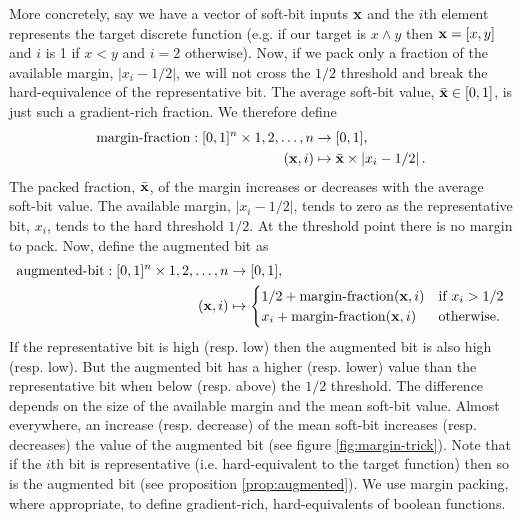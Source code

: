 \documentclass{article} %
\begin{document}
More concretely, say we have a vector of soft-bit inputs ${\bf x}$ and the $i$th element represents the target discrete function (e.g. if our target is $x \wedge y$ then ${\bf x}=[x,y]$ and $i$ is 1 if $x<y$ and $i=2$ otherwise). Now, if we pack only a fraction of the available margin, $|x_{i}-1/2|$, we will not cross the $1/2$ threshold and break the hard-equivalence of the representative bit. The average soft-bit value, $\bar{\bf x} \in [0,1]$, is just such a gradient-rich fraction. We therefore define 
\begin{equation*}
\begin{aligned}
\operatorname{margin-fraction}: [0,1]^{n} \times 1,2,\dots,n &\to [0,1],\\
({\bf x}, i) &\mapsto \bar{\bf x} \times \left|x_{i} - 1/2\right| \text{.}
\end{aligned}
\end{equation*}
The packed fraction, $\bar{\bf x}$, of the margin increases or decreases with the average soft-bit value. The available margin, $\left|x_{i} - 1/2\right|$, tends to zero as the representative bit, $x_{i}$, tends to the hard threshold $1/2$. At the threshold point there is no margin to pack. Now, define the augmented bit as
\begin{equation}
\begin{aligned}
\operatorname{augmented-bit}: [0,1]^{n} \times 1,2,\dots,n &\to [0,1],\\
({\bf x}, i) &\mapsto 
\begin{cases}
1/2 + \operatorname{margin-fraction}({\bf x}, i) & \text{if } x_{i} > 1/2 \\
x_{i} + \operatorname{margin-fraction}({\bf x}, i) & \text{otherwise.}
\end{cases}
\end{aligned}
\label{eq:augmented-bit}
\end{equation}
If the representative bit is high (resp. low) then the augmented bit is also high (resp. low). 
But the augmented bit has a higher (resp. lower) value than the representative bit when below (resp. above) the $1/2$ threshold. The difference depends on the size of the available margin and the mean soft-bit value. Almost everywhere, an increase (resp. decrease) of the mean soft-bit increases (resp. decreases) the value of the augmented bit (see figure \ref{fig:margin-trick}). Note that if the $i$th bit is representative (i.e. hard-equivalent to the target function) then so is the augmented bit (see proposition \ref{prop:augmented}). We use margin packing, where appropriate, to define gradient-rich, hard-equivalents of boolean functions.
\end{document}
